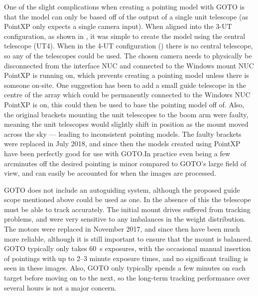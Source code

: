 \begin{colsection}
One of the slight complications when creating a pointing model with GOTO is that the model can only be based off of the output of a single unit telescope (as PointXP only expects a single camera input). When aligned into the 3-UT configuration, as shown in , it was simple to create the model using the central telescope (UT4). When in the 4-UT configuration () there is no central telescope, so any of the telescopes could be used. The chosen camera needs to physically be disconnected from the interface NUC and connected to the Windows mount NUC PointXP is running on, which prevents creating a pointing model unless there is someone on-site. One suggestion has been to add a small guide telescope in the centre of the array which could be permanently connected to the Windows NUC PointXP is on, this could then be used to base the pointing model off of. Also, the original brackets mounting the unit telescopes to the boom arm were faulty, meaning the unit telescopes would slightly shift in position as the mount moved across the sky --- leading to inconsistent pointing models. The faulty brackets were replaced in July 2018, and since then the models created using PointXP have been perfectly good for use with GOTO.\@ In practice even being a few arcminutes off the desired pointing is minor compared to GOTO's large field of view, and can easily be accounted for when the images are processed.

GOTO does not include an autoguiding system, although the proposed guide scope mentioned above could be used as one. In the absence of this the telescope must be able to track accurately. The initial mount drives suffered from tracking problems, and were very sensitive to any imbalances in the weight distribution. The motors were replaced in November 2017, and since then have been much more reliable, although it is still important to ensure that the mount is balanced. GOTO typically only takes \SI{60}{\second} exposures, with the occasional manual insertion of pointings with up to 2--3 minute exposure times, and no significant trailing is seen in these images. Also, GOTO only typically spends a few minutes on each target before moving on to the next, so the long-term tracking performance over several hours is not a major concern.

\end{colsection}


